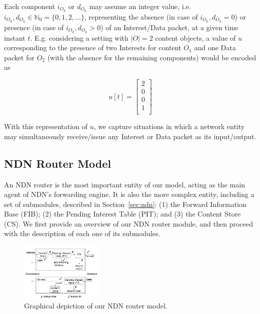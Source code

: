 Each component $i_{O_k}$ or $d_{O_k}$ may assume an integer value, i.e. $i_{O_k}, d_{O_k} \in \mathbb{N}_0 = \{0, 1, 2, ... \}$, 
representing the absence (in case of $i_{O_k}, d_{O_k} = 0$) or presence (in case of $i_{O_k}, d_{O_k} > 0$) of an 
Interest\slash Data packet, at a given time instant $t$. E.g. considering a setting 
with $|O| = 2$ content objects, a value of $u$ corresponding to the presence 
of two Interests for content $O_1$ and one Data packet for $O_2$ (with the absence 
for the remaining components) would be encoded as

\begin{equation}
    u[t] = \begin{bmatrix}     2   \\ 
                                        0   \\ 
                                        0   \\ 
                                        1   \\ \end{bmatrix}
    \label{eq:signal-eg}
\end{equation}\shortvertbreak

With this 
representation of $u$, we capture situations in which a network 
entity may simultaneously receive\slash issue any Interest or Data packet as 
its input\slash output.

\subsection{NDN Router Model}
\label{subsec:meth-overview}

An NDN router is the most important entity of our model, acting 
as the main agent of NDN's forwarding engine. It is also the more complex entity, 
including a set of submodules, 
described in Section~\ref{sec:ndn}: (1) the Forward Information Base (FIB); (2) 
the Pending Interest Table (PIT); and (3) the Content Store (CS). We first 
provide an overview of our NDN router module, and then proceed with the description 
of each one of its submodules.\shortvertbreak

\begin{figure}[h!]

    \centering
    \includegraphics[width=0.35\textwidth]{figures/ndn-forwarding-engine.png}
    \cprotect\caption{Graphical depiction of our NDN router model.}
    \label{fig:ndn-router-overview}

\end{figure}

